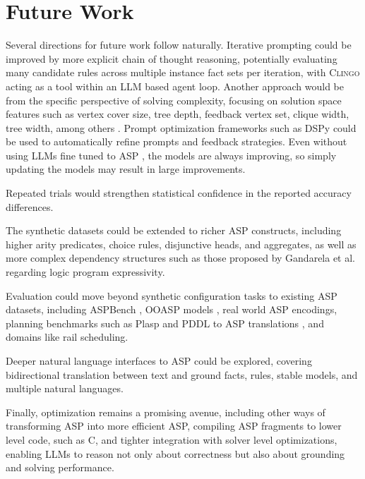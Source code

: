 \documentclass[11pt,a4paper]{article}
\begin{document}
\section{Future Work}

Several directions for future work follow naturally. Iterative prompting could be improved by more explicit chain of thought reasoning, potentially evaluating many candidate rules across multiple instance fact sets per iteration, with \textsc{Clingo} acting as a tool within an LLM based agent loop. Another approach would be from the specific perspective of solving complexity, focusing on solution space features such as vertex cover size, tree depth, feedback vertex set, clique width, tree width, among others \cite{hecher2024extendedversionofstructural}. Prompt optimization frameworks such as DSPy \cite{khattab2023dspycompilingdeclarativelanguage} could be used to automatically refine prompts and feedback strategies. Even without using LLMs fine tuned to ASP \cite{coppolillo2024llaspfinetuninglargelanguage}, the models are always improving, so simply updating the models may result in large improvements.

Repeated trials would strengthen statistical confidence in the reported accuracy differences.

The synthetic datasets could be extended to richer ASP constructs, including higher arity predicates, choice rules, disjunctive heads, and aggregates, as well as more complex dependency structures such as those proposed by Gandarela et al.~\cite{gandarela2025inductivelearninglogicaltheories} regarding logic program expressivity.

Evaluation could move beyond synthetic configuration tasks to existing ASP datasets, including ASPBench \cite{szeider2026aspbenchnaturallanguagelogic}, OOASP models \cite{falkner2015ooaspconnectingobjectorientedlogic}, real world ASP encodings, planning benchmarks such as Plasp and PDDL to ASP translations \cite{dimopoulos2018plasp3effectiveasp}, and domains like rail scheduling.

Deeper natural language interfaces to ASP could be explored, covering bidirectional translation between text and ground facts, rules, stable models, and multiple natural languages.

Finally, optimization remains a promising avenue, including other ways of transforming ASP into more efficient ASP, compiling ASP fragments to lower level code, such as C, and tighter integration with solver level optimizations, enabling LLMs to reason not only about correctness but also about grounding and solving performance.
\end{document}
